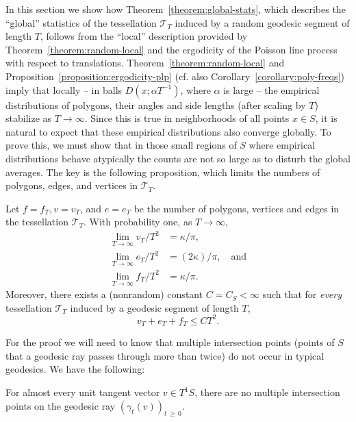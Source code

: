 \documentclass[AHL, Unicode, longabstracts, published]{cedram}
\begin{document}
In this section we show how Theorem~\ref{theorem:global-stats}, which describes the ``global'' statistics of the tessellation $\mathcal{T}_{T}$ induced by a random geodesic segment of length $T$, follows from the ``local'' description provided by Theorem~\ref{theorem:random-local} and the ergodicity of the Poisson line process with respect to translations. Theorem~\ref{theorem:random-local} and Proposition~\ref{proposition:ergodicity-plp} (cf. also Corollary~\ref{corollary:poly-freqs}) imply that locally -- in balls $D (x;\alpha T^{-1})$, where $\alpha$ is large -- the empirical distributions of polygons, their angles and side lengths (after scaling by $T$) stabilize as $T \rightarrow \infty$. Since this is true in neighborhoods of all points $x\in S$, it is natural to expect that these empirical distributions also converge globally. To prove this, we must show that in those small regions of $S$ where empirical distributions behave atypically the counts are not so large as to disturb the global averages. The key is the following proposition, which limits the numbers of polygons, edges, and vertices in $\mathcal{T}_{T}$.

\begin{prop}\label{proposition:siCounts}
Let $f=f_{T}, v=v_{T}$, and $e=e_{T}$ be the number of polygons, vertices and edges in the tessellation $\mathcal{T}_{T}$. With probability one, as $T \rightarrow \infty$,
\begin{align}
\lim_{T \rightarrow \infty} v_{T}/T^{2}&=\kappa/\pi,\label{eq:vertices}
\\
\lim_{T \rightarrow \infty} e_{T}/T^{2}&= (2\kappa)/\pi, \quad \text{and}\label{eq:edges}
\\
\lim_{T \rightarrow \infty} f_{T}/T^{2}&=\kappa/\pi.\label{eq:faces}
\end{align}
Moreover, there exists a (nonrandom) constant $C=C_{S}<\infty$ such that for \emph{every} tessellation $\mathcal{T}_{T}$ induced by a geodesic segment of length $T$,
\begin{equation}\label{eq:v+e+f-bound}
v_{T}+e_{T}+f_{T}\leq CT^{2}.
\end{equation}
\end{prop}

For the proof we will need to know that multiple intersection points (points of $S$ that a geodesic ray passes through more than twice) do not occur in typical geodesics. We have the following:

\goodbreak
\begin{lemm}\label{lemma:noTriplePoints}
For almost every unit tangent vector $v\in T^1S$, there are no multiple intersection points on the geodesic ray $(\gamma_{t} (v))_{t\,\geq\,0}$.
\end{lemm}
\end{document}
